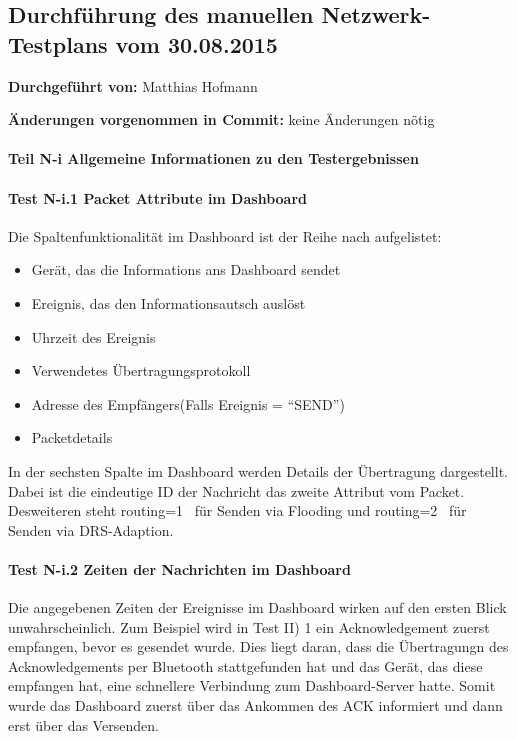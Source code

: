 \subsection{Durchführung des manuellen Netzwerk-Testplans vom 30.08.2015}

\textbf{Durchgeführt von:} Matthias Hofmann

\textbf{Änderungen vorgenommen in Commit:} keine Änderungen nötig

\paragraph{Teil N-i Allgemeine Informationen zu den Testergebnissen}

\paragraph{Test N-i.1 Packet Attribute im Dashboard}

Die Spaltenfunktionalität im Dashboard ist der Reihe nach aufgelistet:

\begin{itemize}
  \item Gerät, das die Informations ans Dashboard sendet
  \item Ereignis, das den Informationsautsch auslöst
  \item Uhrzeit des Ereignis
  \item Verwendetes Übertragungsprotokoll
  \item Adresse des Empfängers(Falls Ereignis = ``SEND'')
  \item Packetdetails
\end{itemize}

In der sechsten Spalte im Dashboard werden Details der Übertragung dargestellt. Dabei ist die eindeutige ID der Nachricht das zweite Attribut vom Packet. Desweiteren steht \glqq routing=1\grqq~ für Senden via Flooding und \glqq routing=2\grqq~ für Senden via DRS-Adaption.

\paragraph{Test N-i.2 Zeiten der Nachrichten im Dashboard}

Die angegebenen Zeiten der Ereignisse im Dashboard wirken auf den ersten Blick unwahrscheinlich. Zum Beispiel wird in Test II) 1 ein Acknowledgement zuerst empfangen, bevor es gesendet wurde. Dies liegt daran, dass die Übertragungn des Acknowledgements per Bluetooth stattgefunden hat und das Gerät, das diese empfangen hat, eine schnellere Verbindung zum Dashboard-Server hatte. Somit wurde das Dashboard zuerst über das Ankommen des ACK informiert und dann erst über das Versenden.

